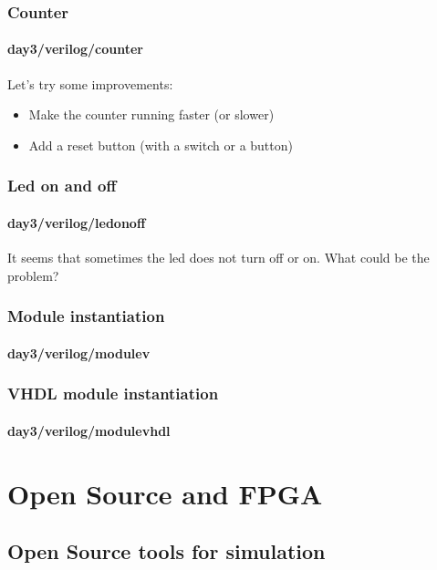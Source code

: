 \documentclass{beamer}
\begin{document}
\begin{frame}\frametitle{Counter}
\framesubtitle{day3/verilog/counter}

\vspace{0.5cm}
Let's try some improvements:
\begin{itemize}
	\item Make the counter running faster (or slower)
	\item Add a reset button (with a switch or a button)
\end{itemize}

\end{frame}
\begin{frame}\frametitle{Led on and off}
\framesubtitle{day3/verilog/ledonoff}

\vspace{1cm}
It seems that sometimes the led does not turn off or on. 
What could be the problem? \\

\end{frame}

\begin{frame}\frametitle{Module instantiation}
\framesubtitle{day3/verilog/modulev}

\vspace{0.1cm}

\end{frame}

\begin{frame}\frametitle{VHDL module instantiation}
\framesubtitle{day3/verilog/modulevhdl}

\vspace{0.1cm}

\end{frame}

\section{Open Source and FPGA}

\subsection{Open Source tools for simulation}
\end{document}

